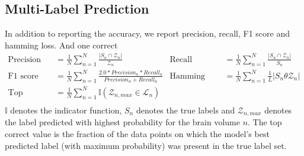 \documentclass{article} %
\begin{document}


 \subsection{Multi-Label Prediction}
In addition to reporting the accuracy, we report precision, recall, F1 score and hamming loss. And one correct
\begin{align*}
 \text{Precision} &=\frac{1}{N} \sum_{n=1}^{N} \frac {|S_n \cap \mathcal{Z}_n|}{\mathcal{Z}_n} & \text{Recall}&= \frac{1}{N} \sum_{n=1}^{N} \frac {|S_n \cap \mathcal{Z}_n|}{S_n}\\
 \text{F1 score} &=\frac{1}{N} \sum_{n=1}^{N} \frac{2.0 * Precision_n * Recall_n}{Precision_n + Recall_n} & \text{Hamming loss}&=\frac{1}{N}\sum_{n=1}^{N}\frac{1}{L} |S_n \theta \mathcal{Z}_n |  \\
 \text{Top correct} &=\frac{1}{N} \displaystyle\sum_{n=1}^{N} \mathbb{I}(\mathcal{Z}_{n,max} \in \mathcal{L}_n)& & \\
\end{align*}
$\mathbb{I}$ denotes the indicator function, $S_n$ denotes the true labels  and $\mathcal{Z}_{n,max}$ denotes the label predicted with highest probability for the brain volume $n$. The top correct value is the fraction of the data points on which the model's best predicted label (with maximum probability) was present in the true label set.
\end{document}

